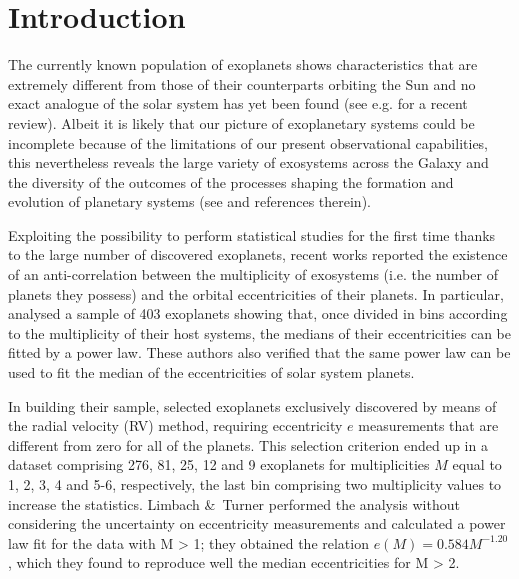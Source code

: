 \documentclass[letter]{aa} %
\begin{document}
        \maketitle
        
        \section{Introduction}
         
        
The currently known population of exoplanets shows characteristics that are extremely different from those of their counterparts orbiting the Sun and no exact analogue of the solar system has yet been found (see e.g. \citealt{hatzes2016} for a recent review). Albeit it is likely that our picture of exoplanetary systems could be incomplete because of the limitations of our present observational capabilities, this nevertheless reveals the large variety of exosystems across the Galaxy and the diversity of the outcomes of the processes shaping the formation and evolution of planetary systems (see \citealt{hatzes2016} and references therein).
        
Exploiting the possibility to perform statistical studies for the first time thanks to the large number of discovered exoplanets, recent works \citep{juric,limbach} reported the existence of an anti-correlation between the multiplicity of exosystems (i.e. the number of planets they possess) and the orbital eccentricities of their planets. In particular, \cite{limbach} analysed a sample of 403 exoplanets showing that, once divided in bins according to the multiplicity of their host systems, the medians of their eccentricities can be fitted by a power law. These authors also verified that the same power law can be used to fit the median of the eccentricities of solar system planets.

In building their sample, \cite{limbach} selected exoplanets exclusively discovered by means of the radial velocity (RV) method, requiring eccentricity $e$ measurements that are different from zero for all of the planets. This selection criterion ended up in a dataset comprising 276, 81, 25, 12 and 9 exoplanets for multiplicities $M$ equal to 1, 2, 3, 4 and 5-6, respectively, the last bin comprising two multiplicity values to increase the statistics. Limbach \&\ Turner performed the analysis without considering the uncertainty on eccentricity measurements and calculated a power law fit for the data with M > 1; they obtained the relation $e(M) = 0.584 M^{-1.20}$, which they found to reproduce well the median eccentricities for M > 2.       
        
\end{document}
